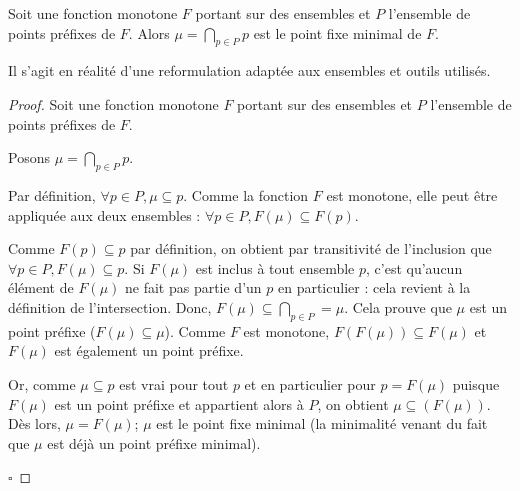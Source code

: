 \begin{theorem}
  Soit une fonction monotone $F$ portant sur des ensembles et $P$ l'ensemble de points préfixes de $F$. Alors $\mu=\bigcap_{p\in P}p$ est le point fixe minimal de $F$.
\end{theorem}

Il s'agit en réalité d'une reformulation adaptée aux ensembles et outils utilisés.

\begin{proof}
  Soit une fonction monotone $F$ portant sur des ensembles et $P$ l'ensemble de points préfixes de $F$.

  Posons $\mu=\bigcap_{p\in P}p$.

  Par définition, $\forall p\in P,\mu\subseteq p$. Comme la fonction $F$ est monotone, elle peut être appliquée aux deux ensembles : $\forall p\in P,F(\mu)\subseteq F(p)$.

  Comme $F(p)\subseteq p$ par définition, on obtient par transitivité de l'inclusion que $\forall p\in P,F(\mu)\subseteq p$.
  Si $F(\mu)$ est inclus à tout ensemble $p$, c'est qu'aucun élément de $F(\mu)$ ne fait pas partie d'un $p$ en particulier : cela revient à la définition de l'intersection. Donc, $F(\mu)\subseteq\bigcap_{p\in P}=\mu$. Cela prouve que $\mu$ est un point préfixe ($F(\mu)\subseteq\mu$). Comme $F$ est monotone, $F(F(\mu))\subseteq F(\mu)$ et $F(\mu)$ est également un point préfixe.

  Or, comme $\mu\subseteq p$ est vrai pour tout $p$ et en particulier pour $p=F(\mu)$ puisque $F(\mu)$ est un point préfixe et appartient alors à $P$, on obtient $\mu\subseteq(F(\mu))$. Dès lors, $\mu=F(\mu)$; $\mu$ est le point fixe minimal (la minimalité venant du fait que $\mu$ est déjà un point préfixe minimal).

  \hfill$\square$
\end{proof}
